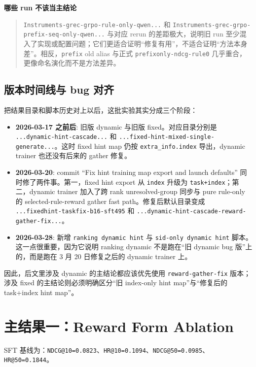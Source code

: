 \documentclass[a4paper]{article}
\newenvironment{riskbox}[1]{\par\medskip\noindent\textbf{#1}\par\begin{quote}}{\end{quote}\medskip}
\begin{document}
\begin{riskbox}{哪些 run 不该当主结论}
\texttt{Instruments-grec-grpo-rule-only-qwen...} 和 \texttt{Instruments-grec-grpo-prefix-seq-only-qwen...} 与对应 rerun 的差距极大，说明旧 run 至少混入了实现或配置问题；它们更适合证明“修复有用”，不适合证明“方法本身差”。相反，\texttt{prefix} old alias 与正式 \texttt{prefixonly-ndcg-rule0} 几乎重合，更像命名演化而不是方法差异。
\end{riskbox}

\subsection{版本时间线与 bug 对齐}

把结果目录和脚本历史对上以后，这批实验其实分成三个阶段：
\begin{itemize}
\item \textbf{2026-03-17 之前后}: 旧版 dynamic 与旧版 fixed。对应目录分别是 \texttt{...dynamic-hint-cascade...} 和 \texttt{...fixed-hint-mixed-single-generate...}。这时 fixed hint map 仍按 \texttt{extra\_info.index} 导出，dynamic trainer 也还没有后来的 gather 修复。
\item \textbf{2026-03-20}: commit ``Fix hint training map export and launch defaults'' 同时修了两件事。第一，fixed hint export 从 \texttt{index} 升级为 \texttt{task+index}；第二，dynamic trainer 加入了跨 rank unresolved-group 同步与 pure rule-only 的 selected-rule-reward gather fast path。修复后默认目录变成 \texttt{...fixedhint-taskfix-b16-sft495} 和 \texttt{...dynamic-hint-cascade-reward-gather-fix...}。
\item \textbf{2026-03-28}: 新增 \texttt{ranking dynamic hint} 与 \texttt{sid-only dynamic hint} 脚本。这一点很重要，因为它说明 ranking dynamic 不是跑在“旧 dynamic bug 版”上的，而是跑在 3 月 20 日修复之后的 dynamic trainer 上。
\end{itemize}

因此，后文里涉及 dynamic 的主结论都应该优先使用 \texttt{reward-gather-fix} 版本；涉及 fixed 的主结论则必须明确区分“旧 index-only hint map”与“修复后的 task+index hint map”。

\section{主结果一：Reward Form Ablation}

SFT 基线为：\texttt{NDCG@10=0.0823}、\texttt{HR@10=0.1094}、\texttt{NDCG@50=0.0985}、\texttt{HR@50=0.1844}。
\end{document}
